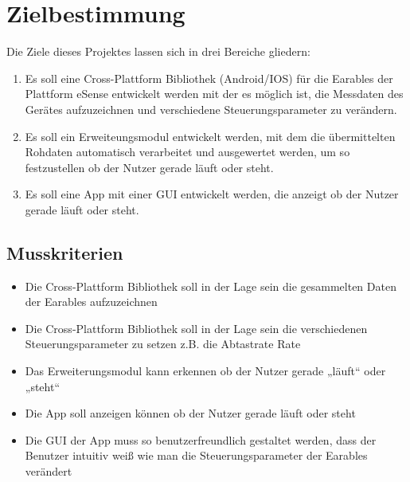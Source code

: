 \documentclass[a4paper,12pt]{article}
\begin{document}
\section{Zielbestimmung}
Die Ziele dieses Projektes lassen sich in drei Bereiche gliedern:
\begin{enumerate}

  \item Es soll eine Cross-Plattform Bibliothek (Android/IOS) für die Earables der Plattform eSense entwickelt werden mit der es möglich ist, die Messdaten des Gerätes aufzuzeichnen und verschiedene Steuerungsparameter zu verändern.
  
  \item Es soll ein Erweiteungsmodul entwickelt werden, mit dem die übermittelten  Rohdaten automatisch verarbeitet und ausgewertet werden, um so festzustellen ob der Nutzer gerade läuft oder steht.
  
  \item Es soll eine App mit einer GUI entwickelt werden, die anzeigt ob der Nutzer gerade läuft oder steht.

\end{enumerate}

\subsection{Musskriterien}

  \begin{itemize}
    \item\text Die Cross-Plattform Bibliothek soll in der Lage sein die gesammelten Daten der Earables aufzuzeichnen
    \item\text Die Cross-Plattform Bibliothek soll in der Lage sein die verschiedenen Steuerungsparameter zu setzen z.B. die Abtastrate Rate
    \item\text Das Erweiterungsmodul kann erkennen ob der Nutzer gerade „läuft“ oder „steht“
    \item\text Die App soll anzeigen können ob der Nutzer gerade läuft oder steht
    \item\text Die GUI der App muss so benutzerfreundlich gestaltet werden, dass der Benutzer intuitiv weiß wie man die Steuerungsparameter der Earables verändert
  \end{itemize}
\end{document}
